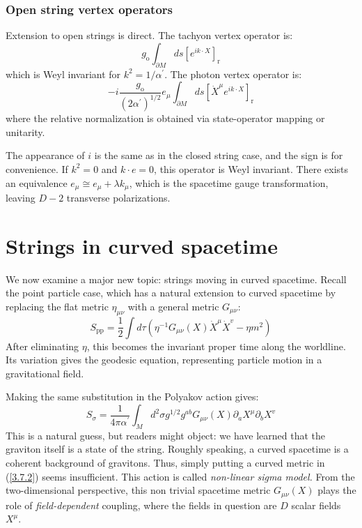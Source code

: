 \subsubsection*{\Large Open string vertex operators}

Extension to open strings is direct. The tachyon vertex operator is:
\begin{equation}
	g_{\mathrm{o}} \int_{\partial M} d s\left[e^{i k \cdot X}\right]_{\mathrm{r}}\label{3.6.25}
\end{equation}
which is Weyl invariant for $k^{2}=1 / \alpha^{\prime}$. The photon vertex operator is:
\begin{equation}
	-i \frac{g_{\mathrm{o}}}{\left(2 \alpha^{\prime}\right)^{1 / 2}} e_{\mu} \int_{\partial M} d s\left[\dot{X}^{\mu} e^{i k \cdot X}\right]_{\mathrm{r}}\label{3.6.26}
\end{equation}
where the relative normalization is obtained via state-operator mapping or unitarity.

The appearance of $i$ is the same as in the closed string case, and the sign is for convenience. If $k^2 = 0$ and $k \cdot e = 0$, this operator is Weyl invariant. There exists an equivalence $e_\mu \cong e_\mu + \lambda k_\mu$, which is the spacetime gauge transformation, leaving $D-2$ transverse polarizations.

\section{\texorpdfstring{Strings in curved spacetime}{3.7 Strings in curved spacetime}}\label{sec:3.7}

We now examine a major new topic: strings moving in curved spacetime. Recall the point particle case, which has a natural extension to curved spacetime by replacing the flat metric $\eta_{\mu\nu}$ with a general metric $G_{\mu\nu}$:
\begin{equation}
	S_{\mathrm{pp}}=\frac{1}{2} \int d \tau\left(\eta^{-1} G_{\mu \nu}(X) \dot{X}^{\mu} \dot{X}^{v}-\eta m^{2}\right)
\end{equation}
After eliminating $\eta$, this becomes the invariant proper time along the worldline. Its variation gives the geodesic equation, representing particle motion in a gravitational field.

Making the same substitution in the Polyakov action gives:
\begin{equation}\label{3.7.2}
	S_{\sigma}=\frac{1}{4 \pi \alpha^{\prime}} \int_{M} d^{2} \sigma g^{1 / 2} g^{a b} G_{\mu \nu}(X) \partial_{a} X^{\mu} \partial_{b} X^{v}
\end{equation}
This is a natural guess, but readers might object: we have learned that the graviton itself is a state of the string. Roughly speaking, a curved spacetime is a coherent background of gravitons. Thus, simply putting a curved metric in (\ref{3.7.2}) seems insufficient. This action is called \textit{non-linear sigma model.} From the two-dimensional perspective, this non trivial spacetime metric $G_{\mu\nu}(X)$ plays the role of \textit{field-dependent} coupling, where the fields in question are $D$ scalar fields $X^{\mu}$.

